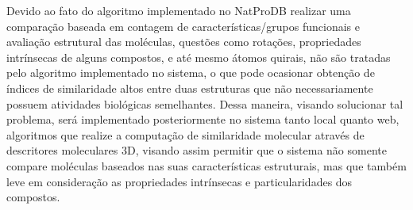 Devido ao fato do algoritmo implementado no NatProDB realizar uma comparação baseada em contagem de características/grupos funcionais e avaliação estrutural das moléculas, questões como rotações, propriedades intrínsecas de alguns compostos, e até mesmo átomos quirais, não são tratadas pelo algoritmo implementado no sistema, o que pode ocasionar obtenção de índices de similaridade altos entre duas estruturas que não necessariamente possuem atividades biológicas semelhantes. Dessa maneira, visando solucionar tal problema, será implementado posteriormente no sistema tanto local quanto web, algoritmos que realize a computação de similaridade molecular através de descritores moleculares 3D, visando assim permitir que o sistema não somente compare moléculas baseados nas suas características estruturais, mas que também leve em consideração as propriedades intrínsecas e particularidades dos compostos.
  
     

  